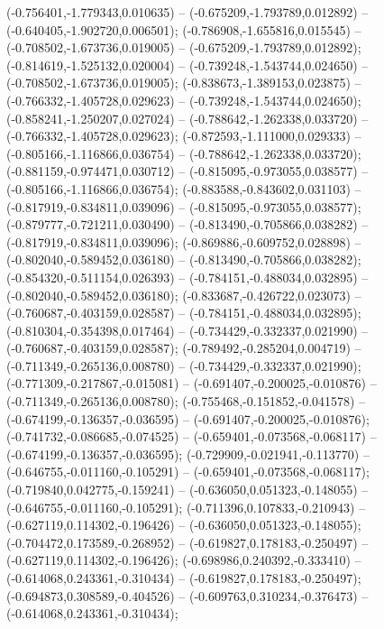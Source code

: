  (-0.756401,-1.779343,0.010635) -- (-0.675209,-1.793789,0.012892) -- (-0.640405,-1.902720,0.006501);
 (-0.786908,-1.655816,0.015545) -- (-0.708502,-1.673736,0.019005) -- (-0.675209,-1.793789,0.012892);
 (-0.814619,-1.525132,0.020004) -- (-0.739248,-1.543744,0.024650) -- (-0.708502,-1.673736,0.019005);
 (-0.838673,-1.389153,0.023875) -- (-0.766332,-1.405728,0.029623) -- (-0.739248,-1.543744,0.024650);
 (-0.858241,-1.250207,0.027024) -- (-0.788642,-1.262338,0.033720) -- (-0.766332,-1.405728,0.029623);
 (-0.872593,-1.111000,0.029333) -- (-0.805166,-1.116866,0.036754) -- (-0.788642,-1.262338,0.033720);
 (-0.881159,-0.974471,0.030712) -- (-0.815095,-0.973055,0.038577) -- (-0.805166,-1.116866,0.036754);
 (-0.883588,-0.843602,0.031103) -- (-0.817919,-0.834811,0.039096) -- (-0.815095,-0.973055,0.038577);
 (-0.879777,-0.721211,0.030490) -- (-0.813490,-0.705866,0.038282) -- (-0.817919,-0.834811,0.039096);
 (-0.869886,-0.609752,0.028898) -- (-0.802040,-0.589452,0.036180) -- (-0.813490,-0.705866,0.038282);
 (-0.854320,-0.511154,0.026393) -- (-0.784151,-0.488034,0.032895) -- (-0.802040,-0.589452,0.036180);
 (-0.833687,-0.426722,0.023073) -- (-0.760687,-0.403159,0.028587) -- (-0.784151,-0.488034,0.032895);
 (-0.810304,-0.354398,0.017464) -- (-0.734429,-0.332337,0.021990) -- (-0.760687,-0.403159,0.028587);
 (-0.789492,-0.285204,0.004719) -- (-0.711349,-0.265136,0.008780) -- (-0.734429,-0.332337,0.021990);
 (-0.771309,-0.217867,-0.015081) -- (-0.691407,-0.200025,-0.010876) -- (-0.711349,-0.265136,0.008780);
 (-0.755468,-0.151852,-0.041578) -- (-0.674199,-0.136357,-0.036595) -- (-0.691407,-0.200025,-0.010876);
 (-0.741732,-0.086685,-0.074525) -- (-0.659401,-0.073568,-0.068117) -- (-0.674199,-0.136357,-0.036595);
 (-0.729909,-0.021941,-0.113770) -- (-0.646755,-0.011160,-0.105291) -- (-0.659401,-0.073568,-0.068117);
 (-0.719840,0.042775,-0.159241) -- (-0.636050,0.051323,-0.148055) -- (-0.646755,-0.011160,-0.105291);
 (-0.711396,0.107833,-0.210943) -- (-0.627119,0.114302,-0.196426) -- (-0.636050,0.051323,-0.148055);
 (-0.704472,0.173589,-0.268952) -- (-0.619827,0.178183,-0.250497) -- (-0.627119,0.114302,-0.196426);
 (-0.698986,0.240392,-0.333410) -- (-0.614068,0.243361,-0.310434) -- (-0.619827,0.178183,-0.250497);
 (-0.694873,0.308589,-0.404526) -- (-0.609763,0.310234,-0.376473) -- (-0.614068,0.243361,-0.310434);
